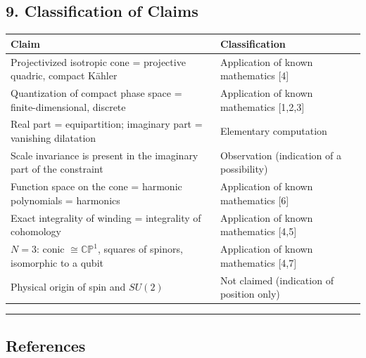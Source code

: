 \documentclass[
  a4paper,
]{article}
\newcounter{none} %
\begin{document}
\subsection{9. Classification of Claims}\label{classification-of-claims}

{\def\LTcaptype{none} %
\begin{longtable}[]{@{}
  >{\raggedright\arraybackslash}p{}
  >{\raggedright\arraybackslash}p{}@{}}
\toprule\noalign{}
\begin{minipage}[b]{\linewidth}\raggedright
Claim
\end{minipage} & \begin{minipage}[b]{\linewidth}\raggedright
Classification
\end{minipage} \\
\midrule\noalign{}
\endhead
\bottomrule\noalign{}
\endlastfoot
Projectivized isotropic cone = projective quadric, compact Kähler &
Application of known mathematics {[}4{]} \\
Quantization of compact phase space = finite-dimensional, discrete &
Application of known mathematics {[}1,2,3{]} \\
Real part = equipartition; imaginary part = vanishing dilatation &
Elementary computation \\
Scale invariance is present in the imaginary part of the constraint &
Observation (indication of a possibility) \\
Function space on the cone = harmonic polynomials = harmonics &
Application of known mathematics {[}6{]} \\
Exact integrality of winding = integrality of cohomology & Application
of known mathematics {[}4,5{]} \\
\(N=3\): conic \(\cong\mathbb{CP}^1\), squares of spinors, isomorphic to
a qubit & Application of known mathematics {[}4,7{]} \\
Physical origin of spin and \(SU(2)\) & Not claimed (indication of
position only) \\
\end{longtable}
}

\begin{center}\rule{0.5\linewidth}{0.5pt}\end{center}

\subsection{References}\label{references}
\end{document}
